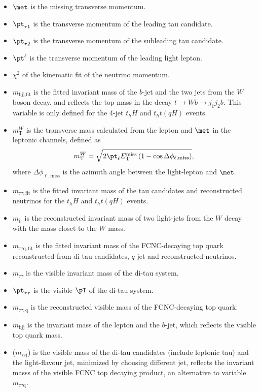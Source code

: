 \begin{itemize}
\item $\met$ is the missing transverse momentum.
\item ${\pt}_{\tau1} $ is the transverse momentum of the leading tau candidate.
\item ${\pt}_{\tau2}$ is the transverse momentum of the subleading tau candidate.
\item ${\pt}^{\ell}$ is the transverse momentum of the leading light lepton.
\item $\chi^2$ of the kinematic fit of the neutrino momentum.
\item $m_{\text{bjj},\text{fit}}$ is the fitted invariant mass of the $b$-jet and the two jets from the $W$ boson decay, and reflects the top mass in the decay $t\to Wb \to j_1j_2b$. This variable is only defined for the 4-jet $t_hH$ and $t_ht(qH)$ events.
\item $m^{W}_{\text{T}}$ is the transverse mass calculated from the lepton and $\met$ in the leptonic channels, defined as
\begin{equation}
m^{W}_{\text{T}} = \sqrt{2 {\pt}_{\ell} E_{\text{T}}^{\text{miss}} \left(1-\cos\Delta\phi_{\ell,\text{miss}} \right)},  
\end{equation}
where $\Delta\phi_{\ell,\text{miss}}$ is the azimuth angle between the light-lepton and $\met$.  
\item $m_{\tau\tau,\text{fit}}$ is the fitted invariant mass of the tau candidates and reconstructed neutrinos for the $t_hH$ and $t_ht(qH)$ events. 
\item $m_{\text{jj}}$ is the reconstructed invariant mass of two light-jets from the $W$ decay with the mass closet to the $W$ mass.
\item $m_{\tau\tau\text{q},\text{fit}}$ is the fitted invariant mass of the FCNC-decaying top quark reconstructed from di-tau candidates, $q$-jet and reconstructed neutrinos.
\item $m_{\tau\tau}$ is the visible invariant mass of the di-tau system. %
\item ${\pt}_{\tau\tau}$ is the visible $\pT$ of the di-tau system.
\item $m_{\tau\tau,\text{q}}$ is the reconstructed visible mass of the FCNC-decaying top quark.
\item $m_{\text{bjj}}$ is the invariant mass of the lepton and the $b$-jet, which reflects the visible top quark mass.
\item {}($m_{\tau\tau \text{j}}$) is the visible mass of the di-tau candidates (include leptonic tau) and the light-flavour jet, minimized by choosing different jet, reflects the invariant masss of the visible FCNC top decaying product, an alternative to variable $m_{\tau\tau\text{q}}$.

\end{itemize}

